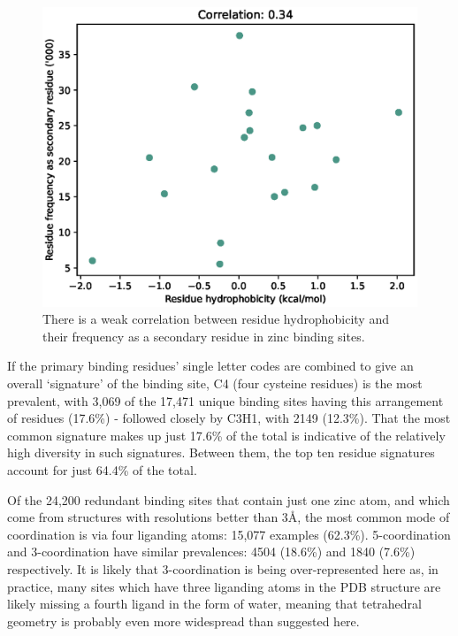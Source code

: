 \begin{figure}
\centering
\includegraphics[width=1.0\textwidth]{Figures/secondary-residues.eps}
\caption[Correlation between residue hydrophobicity and their frequency as a secondary residue in zinc binding sites]{\label{fig:secondary-residues} There is a weak correlation between residue hydrophobicity and their frequency as a secondary residue in zinc binding sites.}
\end{figure}

If the primary binding residues' single letter codes are combined to give an overall `signature' of the binding site, C4 (four cysteine residues) is the most prevalent, with 3,069 of the 17,471 unique binding sites having this arrangement of residues (17.6\%) - followed closely by C3H1, with 2149 (12.3\%). That the most common signature makes up just 17.6\% of the total is indicative of the relatively high diversity in such signatures. Between them, the top ten residue signatures account for just 64.4\% of the total.

Of the 24,200 redundant binding sites that contain just one zinc atom, and which come from structures with resolutions better than 3\AA, the most common mode of coordination is via four liganding atoms: 15,077 examples (62.3\%). 5-coordination and 3-coordination have similar prevalences: 4504 (18.6\%) and 1840 (7.6\%) respectively. It is likely that 3-coordination is being over-represented here as, in practice, many sites which have three liganding atoms in the PDB structure are likely missing a fourth ligand in the form of water, meaning that tetrahedral geometry is probably even more widespread than suggested here.

